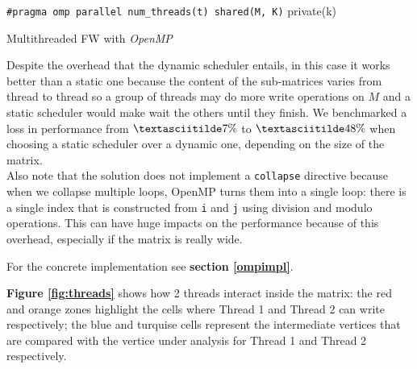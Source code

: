 \begin{algorithm}[h!]

\SetAlgoLined

\texttt{\#pragma omp parallel num\_threads(t) shared(M, K)} private(k) \\

 
\caption{Multithreaded FW with \emph{OpenMP}}\label{alg:omp}
\end{algorithm}


Despite the overhead that the dynamic scheduler entails, in this case it works better than a static one because the
content of the sub-matrices varies from thread to thread so a group of threads may do more write operations on $M$ and a
static scheduler would make wait the others until they finish. We benchmarked a loss in performance from $\textasciitilde7\%$ to $\textasciitilde48\%$ when choosing a static scheduler over
a dynamic one, depending on the size of the matrix.
 \\
Also note that the solution does not implement a \texttt{collapse} directive because when we collapse multiple loops, OpenMP turns them into a single loop: there is a single
index that is constructed from \texttt{i} and \texttt{j} using division and modulo operations. This can
have huge impacts on the performance because of this overhead, especially if the matrix is really wide.

For the concrete implementation see \textbf{section \ref{ompimpl}}.

\textbf{Figure \ref*{fig:threads}} shows how 2 threads interact inside the matrix: the red and orange zones highlight the cells where
Thread 1 and Thread 2 can write respectively; the blue and turquise cells represent the intermediate vertices that are compared
with the vertice under analysis for Thread 1 and Thread 2 respectively.

